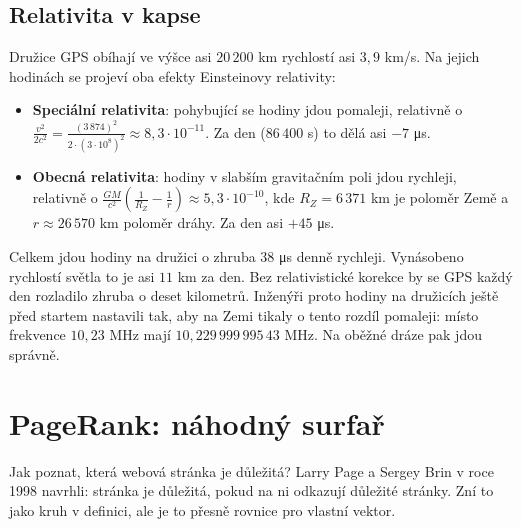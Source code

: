 \subsection{Relativita v kapse}

Družice GPS obíhají ve výšce asi $20\,200$ km rychlostí asi $3{,}9$ km/s. Na jejich hodinách se projeví oba efekty Einsteinovy relativity:
\begin{itemize}
  \item \textbf{Speciální relativita}: pohybující se hodiny jdou pomaleji, relativně o $\frac{v^2}{2c^2} = \frac{(3\,874)^2}{2\cdot(3\cdot 10^8)^2}\approx 8{,}3\cdot 10^{-11}$. Za den ($86\,400$ s) to dělá asi $-7$ \si{\micro\second}.
  \item \textbf{Obecná relativita}: hodiny v slabším gravitačním poli jdou rychleji, relativně o $\frac{GM}{c^2}\left(\frac{1}{R_Z} - \frac{1}{r}\right)\approx 5{,}3\cdot 10^{-10}$, kde $R_Z = 6\,371$ km je poloměr Země a $r\approx 26\,570$ km poloměr dráhy. Za den asi $+45$ \si{\micro\second}.
\end{itemize}
Celkem jdou hodiny na družici o zhruba $38$ \si{\micro\second} denně rychleji. Vynásobeno rychlostí světla to je asi $11$ km za den. Bez relativistické korekce by se GPS každý den rozladilo zhruba o deset kilometrů. Inženýři proto hodiny na družicích ještě před startem nastavili tak, aby na Zemi tikaly o tento rozdíl pomaleji: místo frekvence $10{,}23$ MHz mají $10{,}229\,999\,995\,43$ MHz. Na oběžné dráze pak jdou správně.

\section{PageRank: náhodný surfař}

Jak poznat, která webová stránka je důležitá? Larry Page a Sergey Brin v roce 1998 navrhli: stránka je důležitá, pokud na ni odkazují důležité stránky. Zní to jako kruh v definici, ale je to přesně rovnice pro vlastní vektor.

\begin{center}
\end{center}

